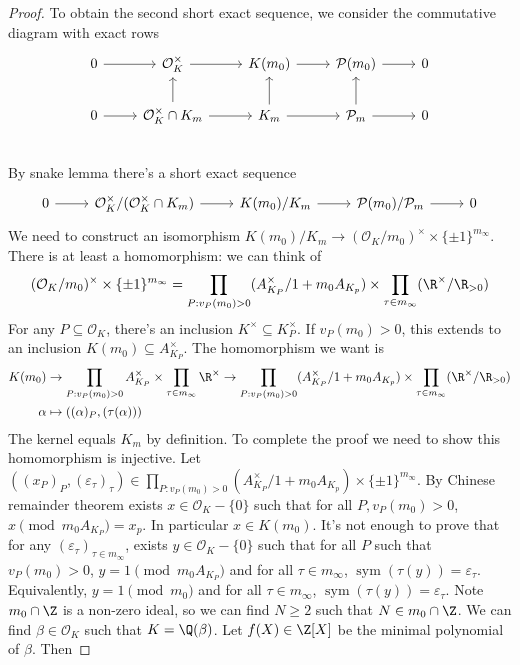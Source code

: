 \documentclass[a4paper]{article}
\renewcommand*{\O}{\mathcal{O}}
\begin{document}
\begin{proof}
  To obtain the second short exact sequence, we consider the commutative diagram with exact rows
  \[
    \begin{tikzcd}
      0 \ar[r] & \O_K^\times \ar[r] & K(m_0) \ar[r] & \mathcal P(m_0) \ar[r] & 0 \\
      0 \ar[r] & \O_K^\times \cap K_m \ar[r] \ar[u] & K_m \ar[u] \ar[r] & \mathcal P_m \ar[r] \ar[u] & 0 \\
    \end{tikzcd}
  \]
  By snake lemma there's a short exact sequence
  \[
    \begin{tikzcd}
      0 \ar[r] & \O_K^\times/(\O_K^\times \cap K_m) \ar[r] & K(m_0)/K_m \ar[r] & \mathcal P(m_0)/\mathcal P_m \ar[r] & 0
    \end{tikzcd}
  \]
  We need to construct an isomorphism \(K(m_0)/K_m \to (\O_K/m_0)^\times \times \{\pm 1\}^{m_\infty}\). There is at least a homomorphism: we can think of
  \[
    (\O_K/m_0)^\times \times \{\pm 1\}^{m_\infty} = \prod_{P: v_P(m_0) > 0} (A_{K_P}^\times/1 + m_0 A_{K_p}) \times \prod_{\tau \in m_\infty} (\R^\times/\R_{> 0})
  \]
  For any \(P \subseteq \O_K\), there's an inclusion \(K^\times \subseteq K_P^\times\). If \(v_P(m_0) > 0\), this extends to an inclusion \(K(m_0) \subseteq A_{K_P}^\times\). The homomorphism we want is
  \begin{align*}
    K(m_0) &\to \prod_{P: v_P(m_0) > 0} A_{K_P}^\times \times \prod_{\tau \in m_\infty} \R^\times \to \prod_{P: v_P(m_0) > 0} (A_{K_P}^\times/1 + m_0 A_{K_p}) \times \prod_{\tau \in m_\infty} (\R^\times/\R_{> 0}) \\
    \alpha &\mapsto ((\alpha)_P, (\tau(\alpha)))
  \end{align*}
  The kernel equals \(K_m\) by definition. To complete the proof we need to show this homomorphism is injective. Let \(((x_P)_P, (\varepsilon_\tau)_\tau) \in \prod_{P: v_P(m_0) > 0} (A_{K_P}^\times/1 + m_0 A_{K_p}) \times \{\pm 1\}^{m_\infty}\). By Chinese remainder theorem exists \(x \in \O_K - \{0\}\) such that for all \(P, v_P(m_0) > 0\), \(x \pmod{m_0 A_{K_P}} = x_p\). In particular \(x \in K(m_0)\). It's not enough to prove that for any \((\varepsilon_\tau)_{\tau \in m_\infty}\), exists \(y \in \O_K - \{0\}\) such that for all \(P\) such that \(v_P(m_0) > 0\), \(y = 1 \pmod{m_0 A_{K_P}}\) and for all \(\tau \in m_\infty\), \(\operatorname{sym}(\tau(y)) = \varepsilon_\tau\). Equivalently, \(y = 1 \pmod{m_0}\) and for all \(\tau \in m_\infty\), \(\operatorname{sym}(\tau(y)) = \varepsilon_\tau\). Note \(m_0 \cap \Z\) is a non-zero ideal, so we can find \(N \geq 2\) such that \(N \in m_0 \cap \Z\). We can find \(\beta \in \O_K\) such that \(K = \Q(\beta)\). Let \(f(X) \in \Z[X]\) be the minimal polynomial of \(\beta\). Then

\end{proof}
\end{document}
